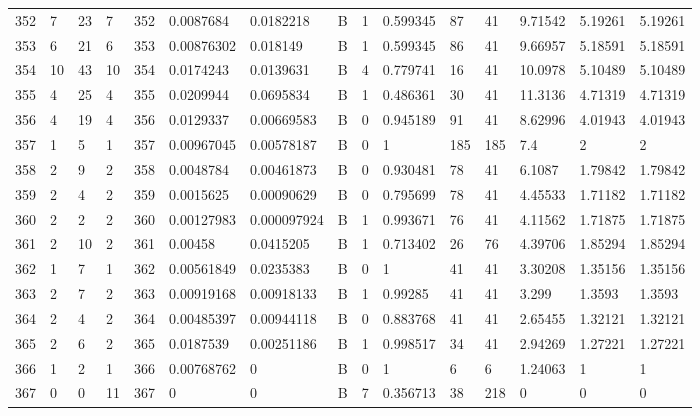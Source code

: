 \begin{latin}
\begin{longtable}{lllllllllllllll}
	352 & 7  & 23  & 7  & 352 & 0.0087684      & 0.0182218      & B & 1  & 0.599345 & 87   & 41   & 9.71542 & 5.19261 & 5.19261 \\
	353 & 6  & 21  & 6  & 353 & 0.00876302     & 0.018149       & B & 1  & 0.599345 & 86   & 41   & 9.66957 & 5.18591 & 5.18591 \\
	354 & 10 & 43  & 10 & 354 & 0.0174243      & 0.0139631      & B & 4  & 0.779741 & 16   & 41   & 10.0978 & 5.10489 & 5.10489 \\
	355 & 4  & 25  & 4  & 355 & 0.0209944      & 0.0695834      & B & 1  & 0.486361 & 30   & 41   & 11.3136 & 4.71319 & 4.71319 \\
	356 & 4  & 19  & 4  & 356 & 0.0129337      & 0.00669583     & B & 0  & 0.945189 & 91   & 41   & 8.62996 & 4.01943 & 4.01943 \\
	357 & 1  & 5   & 1  & 357 & 0.00967045     & 0.00578187     & B & 0  & 1        & 185  & 185  & 7.4     & 2       & 2       \\
	358 & 2  & 9   & 2  & 358 & 0.0048784      & 0.00461873     & B & 0  & 0.930481 & 78   & 41   & 6.1087  & 1.79842 & 1.79842 \\
	359 & 2  & 4   & 2  & 359 & 0.0015625      & 0.00090629     & B & 0  & 0.795699 & 78   & 41   & 4.45533 & 1.71182 & 1.71182 \\
	360 & 2  & 2   & 2  & 360 & 0.00127983     & 0.000097924    & B & 1  & 0.993671 & 76   & 41   & 4.11562 & 1.71875 & 1.71875 \\
	361 & 2  & 10  & 2  & 361 & 0.00458        & 0.0415205      & B & 1  & 0.713402 & 26   & 76   & 4.39706 & 1.85294 & 1.85294 \\
	362 & 1  & 7   & 1  & 362 & 0.00561849     & 0.0235383      & B & 0  & 1        & 41   & 41   & 3.30208 & 1.35156 & 1.35156 \\
	363 & 2  & 7   & 2  & 363 & 0.00919168     & 0.00918133     & B & 1  & 0.99285  & 41   & 41   & 3.299   & 1.3593  & 1.3593  \\
	364 & 2  & 4   & 2  & 364 & 0.00485397     & 0.00944118     & B & 0  & 0.883768 & 41   & 41   & 2.65455 & 1.32121 & 1.32121 \\
	365 & 2  & 6   & 2  & 365 & 0.0187539      & 0.00251186     & B & 1  & 0.998517 & 34   & 41   & 2.94269 & 1.27221 & 1.27221 \\
	366 & 1  & 2   & 1  & 366 & 0.00768762     & 0              & B & 0  & 1        & 6    & 6    & 1.24063 & 1       & 1       \\
	367 & 0  & 0   & 11 & 367 & 0              & 0              & B & 7  & 0.356713 & 38   & 218  & 0       & 0       & 0       \\

\end{longtable}
\end{latin}
